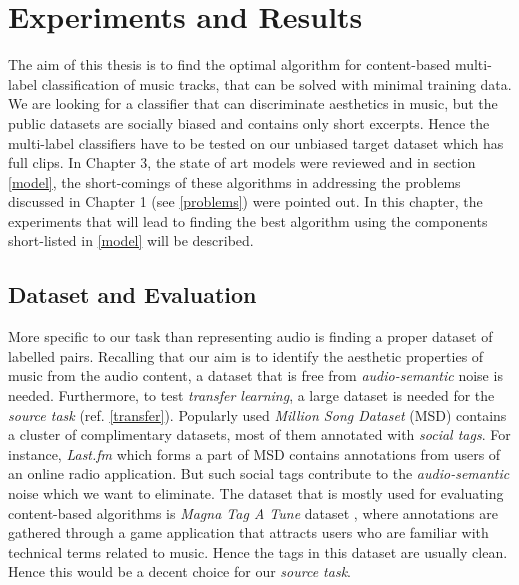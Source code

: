 

\chapter{Experiments and Results} %

\label{Chapter4} %

The aim of this thesis is to find the optimal algorithm for content-based multi-label classification of music tracks, that can be solved with minimal training data. We are looking for a classifier that can discriminate aesthetics in music, but the public datasets are socially biased and contains only short excerpts. Hence the multi-label classifiers have to be tested on our unbiased target dataset which has full clips. In Chapter 3, the state of art models were reviewed and in section \ref{model}, the short-comings of these algorithms in addressing the problems discussed in Chapter 1 (see \ref{problems}) were pointed out. In this chapter, the experiments that will lead to finding the best algorithm using the components short-listed in \ref{model} will be described.

\section{Dataset and Evaluation}
\label{dataset}
More specific to our task than representing audio is finding a proper dataset of labelled pairs. Recalling that our aim is to identify the aesthetic properties of music from the audio content, a dataset that is free from \textit{audio-semantic} noise is needed. Furthermore, to test \textit{transfer learning}, a large dataset is needed for the \textit{source task} (ref. \ref{transfer}). Popularly used \textit{Million Song Dataset} (MSD) \cite{MSD} contains a cluster of complimentary datasets, most of them annotated with \textit{social tags}. For instance, \textit{Last.fm} which forms a part of MSD contains annotations from users of an online radio application. But such social tags contribute to the \textit{audio-semantic} noise which we want to eliminate. The dataset that is mostly used for evaluating content-based algorithms is \textit{Magna Tag A Tune} dataset \cite{MTT}, where annotations are gathered through a game application that attracts users who are familiar with technical terms related to music. Hence the tags in this dataset are usually clean. Hence this would be a decent choice for our \textit{source task}.


